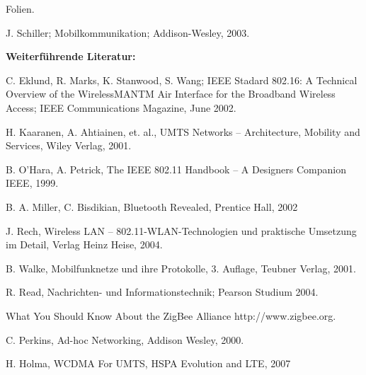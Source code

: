 \begin{course}
\begin{content}
\end{content}

\begin{media}Folien.

\end{media}

\begin{literature}J. Schiller; Mobilkommunikation; Addison-Wesley, 2003.

 

\textbf{Weiterführende Literatur:}

 

C. Eklund, R. Marks, K. Stanwood, S. Wang; IEEE Stadard 802.16: A Technical Overview of the WirelessMANTM Air Interface for the Broadband Wireless Access; IEEE Communications Magazine, June 2002.

 

H. Kaaranen, A. Ahtiainen, et. al., UMTS Networks – Architecture, Mobility and Services, Wiley Verlag, 2001.

 

B. O’Hara, A. Petrick, The IEEE 802.11 Handbook – A Designers Companion IEEE, 1999.

 

B. A. Miller, C. Bisdikian, Bluetooth Revealed, Prentice Hall, 2002

 

J. Rech, Wireless LAN – 802.11-WLAN-Technologien und praktische Umsetzung im Detail, Verlag Heinz Heise, 2004.

 

B. Walke, Mobilfunknetze und ihre Protokolle, 3. Auflage, Teubner Verlag, 2001.

 

R. Read, Nachrichten- und Informationstechnik; Pearson Studium 2004.

 

What You Should Know About the ZigBee Alliance http://www.zigbee.org.

 

C. Perkins, Ad-hoc Networking, Addison Wesley, 2000.

 

H. Holma, WCDMA For UMTS, HSPA Evolution and LTE, 2007

\end{literature}



\end{course}